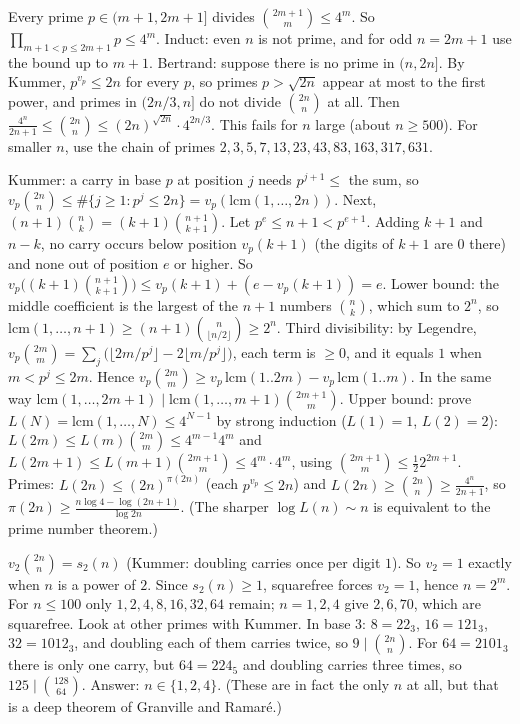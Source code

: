 \documentclass[11pt,a4paper]{article}
\begin{document}

 Every prime $p\in(m+1,2m+1]$ divides $\binom{2m+1}m\le4^m$. So $\prod_{m+1<p\le2m+1}p\le4^m$. Induct: even $n$ is not prime, and for odd $n=2m+1$ use the bound up to $m+1$.
 Bertrand: suppose there is no prime in $(n,2n]$. By Kummer, $p^{v_p}\le2n$ for every $p$, so primes $p>\sqrt{2n}$ appear at most to the first power, and primes in $(2n/3,n]$ do not divide $\binom{2n}n$ at all.
 Then $\frac{4^n}{2n+1}\le\binom{2n}n\le(2n)^{\sqrt{2n}}\cdot4^{2n/3}$. This fails for $n$ large (about $n\ge500$). For smaller $n$, use the chain of primes $2,3,5,7,13,23,43,83,163,317,631$.

 Kummer: a carry in base $p$ at position $j$ needs $p^{j+1}\le$ the sum, so $v_p\binom{2n}n\le\#\{j\ge1:p^j\le2n\}=v_p(\mathrm{lcm}(1,\dots,2n))$. Next, $(n+1)\binom nk=(k+1)\binom{n+1}{k+1}$. Let $p^e\le n+1<p^{e+1}$. Adding $k+1$ and $n-k$, no carry occurs below position $v_p(k+1)$ (the digits of $k+1$ are $0$ there) and none out of position $e$ or higher. So $v_p\bigl((k+1)\binom{n+1}{k+1}\bigr)\le v_p(k+1)+(e-v_p(k+1))=e$.
 Lower bound: the middle coefficient is the largest of the $n+1$ numbers $\binom nk$, which sum to $2^n$, so $\mathrm{lcm}(1,\dots,n+1)\ge(n+1)\binom n{\lfloor n/2\rfloor}\ge2^n$. Third divisibility: by Legendre, $v_p\binom{2m}m=\sum_j\bigl(\lfloor 2m/p^j\rfloor-2\lfloor m/p^j\rfloor\bigr)$, each term is $\ge0$, and it equals $1$ when $m<p^j\le2m$. Hence $v_p\binom{2m}m\ge v_p\,\mathrm{lcm}(1..2m)-v_p\,\mathrm{lcm}(1..m)$. In the same way $\mathrm{lcm}(1,\dots,2m+1)\mid\mathrm{lcm}(1,\dots,m+1)\binom{2m+1}m$.
 Upper bound: prove $L(N)=\mathrm{lcm}(1,\dots,N)\le4^{N-1}$ by strong induction ($L(1)=1$, $L(2)=2$): $L(2m)\le L(m)\binom{2m}m\le4^{m-1}4^m$ and $L(2m+1)\le L(m+1)\binom{2m+1}m\le4^m\cdot4^m$, using $\binom{2m+1}m\le\frac12 2^{2m+1}$. Primes: $L(2n)\le(2n)^{\pi(2n)}$ (each $p^{v_p}\le2n$) and $L(2n)\ge\binom{2n}n\ge\frac{4^n}{2n+1}$, so $\pi(2n)\ge\frac{n\log4-\log(2n+1)}{\log2n}$. (The sharper $\log L(n)\sim n$ is equivalent to the prime number theorem.)

 $v_2\binom{2n}n=s_2(n)$ (Kummer: doubling carries once per digit $1$). So $v_2=1$ exactly when $n$ is a power of $2$.
 Since $s_2(n)\ge1$, squarefree forces $v_2=1$, hence $n=2^m$. For $n\le100$ only $1,2,4,8,16,32,64$ remain; $n=1,2,4$ give $2,6,70$, which are squarefree.
 Look at other primes with Kummer. In base $3$: $8=22_3$, $16=121_3$, $32=1012_3$, and doubling each of them carries twice, so $9\mid\binom{2n}n$. For $64=2101_3$ there is only one carry, but $64=224_5$ and doubling carries three times, so $125\mid\binom{128}{64}$. Answer: $n\in\{1,2,4\}$. (These are in fact the only $n$ at all, but that is a deep theorem of Granville and Ramar\'e.)
\end{document}
